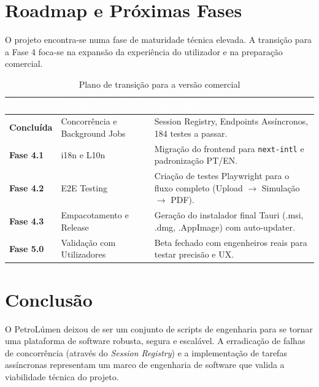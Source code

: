 \documentclass[12pt,a4paper]{article}
\begin{document}
\section{Roadmap e Próximas Fases}

O projeto encontra-se numa fase de maturidade técnica elevada. A transição para a Fase 4 foca-se na expansão da experiência do utilizador e na preparação comercial.

\begin{table}[H]
\centering\small
\begin{tabularx}{\textwidth}{>{\bfseries}p{2cm} p{4cm} X}
\toprule
\rowcolor{tableheader}\textcolor{white}{Fase} & \textcolor{white}{Atividade Principal} & \textcolor{white}{Entregável}\\
\midrule
Concluída & Concorrência e Background Jobs & Session Registry, Endpoints Assíncronos, 184 testes a passar.\\
Fase 4.1 & i18n e L10n & Migração do frontend para \texttt{next-intl} e padronização PT/EN.\\
Fase 4.2 & E2E Testing & Criação de testes Playwright para o fluxo completo (Upload $\rightarrow$ Simulação $\rightarrow$ PDF).\\
Fase 4.3 & Empacotamento e Release & Geração do instalador final Tauri (.msi, .dmg, .AppImage) com auto-updater.\\
Fase 5.0 & Validação com Utilizadores & Beta fechado com engenheiros reais para testar precisão e UX.\\
\bottomrule
\end{tabularx}
\caption{Plano de transição para a versão comercial}
\end{table}

\section{Conclusão}

O PetroLúmen deixou de ser um conjunto de scripts de engenharia para se tornar uma plataforma de software robusta, segura e escalável. A erradicação de falhas de concorrência (através do \textit{Session Registry}) e a implementação de tarefas assíncronas representam um marco de engenharia de software que valida a viabilidade técnica do projeto.
\end{document}
